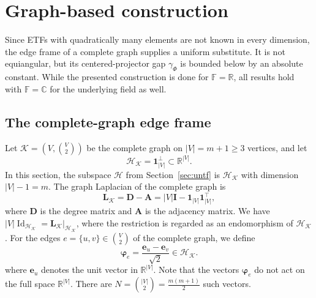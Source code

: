 \documentclass[a4paper]{amsart}
\numberwithin{equation}{section}
\DeclareMathOperator{\Id}{Id}
\begin{document}
 \section{Graph-based construction}\label{sec:graph}

Since ETFs with quadratically many elements are not known in every dimension, the edge frame of a complete graph supplies a uniform substitute.
It is not equiangular, but its centered-projector gap $\gamma_\Phi$ is bounded below by an absolute constant.
While the presented construction is done for $\mathds F=\mathds R$, all results hold with $\mathds F=\mathds C$ for the underlying field as well.



\subsection{The complete-graph edge frame}

Let $\mathcal K=(V,\binom V2)$ be the complete graph on $|V| = m+1 \ge3$ vertices, and let
\begin{equation*}
    \mathcal H_{\mathcal K}=\bm 1_{|V|}^\perp\subset\mathds R^{|V|}.
\end{equation*}
In this section, the subspace $\mathcal H$ from Section~\ref{sec:untf} is $\mathcal H_{\mathcal K}$ with dimension $|V|-1 = m$.
The graph Laplacian of the complete graph is
\begin{equation*}
    \bm L_{\mathcal K}
    = \bm D - \bm A
    = |V|\bm I - \bm 1_{|V|}\bm 1_{|V|}^\top ,
\end{equation*}
where $\bm D$ is the degree matrix and $\bm A$ is the adjacency matrix.
We have $|V|\Id_{\mathcal H_{\mathcal K}} = \bm L_{\mathcal K}|_{\mathcal H_{\mathcal K}}$, where the restriction is regarded as an endomorphism of $\mathcal H_{\mathcal K}$.
For the edges $e=\{u,v\}\in\binom{V}{2}$ of the complete graph, we define
\begin{equation}\label{eq:edgeframe}
    \bm\varphi_e
    =\frac{\bm e_u-\bm e_v}{\sqrt2}\in \mathcal H_{\mathcal K}.
\end{equation}
where $\bm e_u$ denotes the unit vector in $\mathds R^{|V|}$.
Note that the vectors $\bm\varphi_e$ do not act on the full space $\mathds R^{|V|}$.
There are $N=\binom {|V|}2=\frac{m(m+1)}2$ such vectors.
\end{document}
